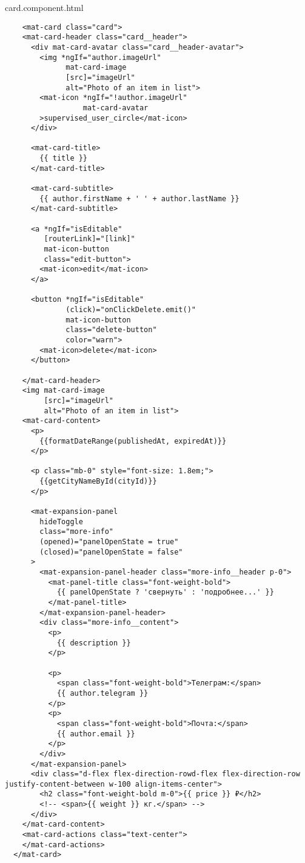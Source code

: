 card.component.html
\begin{lstlisting}
    <mat-card class="card">
    <mat-card-header class="card__header">
      <div mat-card-avatar class="card__header-avatar">
        <img *ngIf="author.imageUrl"
              mat-card-image
              [src]="imageUrl"
              alt="Photo of an item in list">
        <mat-icon *ngIf="!author.imageUrl"
                  mat-card-avatar
        >supervised_user_circle</mat-icon>
      </div>
  
      <mat-card-title>
        {{ title }}
      </mat-card-title>
  
      <mat-card-subtitle>
        {{ author.firstName + ' ' + author.lastName }}
      </mat-card-subtitle>
  
      <a *ngIf="isEditable"
         [routerLink]="[link]"
         mat-icon-button
         class="edit-button">
        <mat-icon>edit</mat-icon>
      </a>
  
      <button *ngIf="isEditable"
              (click)="onClickDelete.emit()"
              mat-icon-button
              class="delete-button"
              color="warn">
        <mat-icon>delete</mat-icon>
      </button>
  
    </mat-card-header>
    <img mat-card-image
         [src]="imageUrl"
         alt="Photo of an item in list">
    <mat-card-content>
      <p>
        {{formatDateRange(publishedAt, expiredAt)}}
      </p>
  
      <p class="mb-0" style="font-size: 1.8em;">
        {{getCityNameById(cityId)}}
      </p>
      
      <mat-expansion-panel
        hideToggle
        class="more-info"
        (opened)="panelOpenState = true"
        (closed)="panelOpenState = false"
      >
        <mat-expansion-panel-header class="more-info__header p-0">
          <mat-panel-title class="font-weight-bold">
            {{ panelOpenState ? 'свернуть' : 'подробнее...' }}
          </mat-panel-title>
        </mat-expansion-panel-header>
        <div class="more-info__content">
          <p>
            {{ description }}
          </p>
  
          <p>
            <span class="font-weight-bold">Телеграм:</span>
            {{ author.telegram }}
          </p>
          <p>
            <span class="font-weight-bold">Почта:</span>
            {{ author.email }}
          </p>
        </div>
      </mat-expansion-panel>
      <div class="d-flex flex-direction-rowd-flex flex-direction-row justify-content-between w-100 align-items-center">
        <h2 class="font-weight-bold m-0">{{ price }} ₽</h2>
        <!-- <span>{{ weight }} кг.</span> -->
      </div>
    </mat-card-content>
    <mat-card-actions class="text-center">
    </mat-card-actions>
  </mat-card>  
\end{lstlisting}



